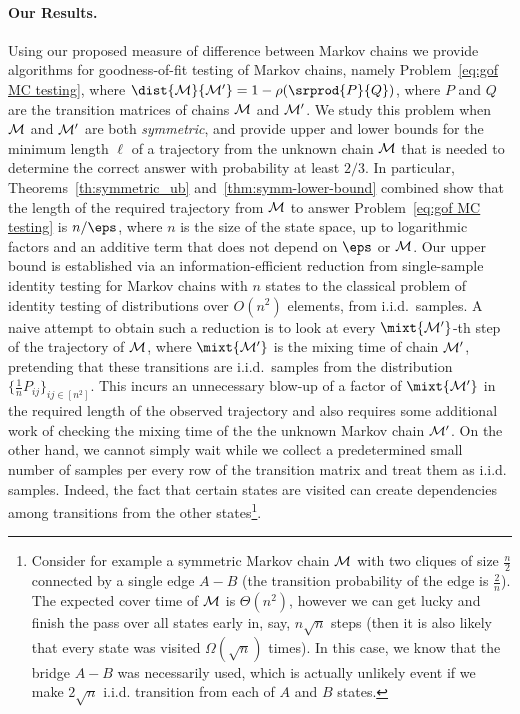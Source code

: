 \paragraph{Our Results.} Using our proposed measure of difference between Markov chains we provide algorithms for  goodness-of-fit testing of Markov chains, namely Problem~\eqref{eq:gof MC testing},
%
%
where $\dist{\cal M}{\cal M'}=1-\rho(\srprod{P}{Q})$, where $P$ and $Q$ are the transition matrices of  chains $\cal M$ and $\cal M'$. We study this problem when $\cal M$ and $\cal M'$ are 
both {\em symmetric}, and provide  upper and lower bounds for the minimum length $\ell$ of a trajectory from the unknown chain $\cal M$ that is needed to determine the correct answer with 
probability at least $2/3$. In particular, Theorems~\ref{th:symmetric_ub} and~\ref{thm:symm-lower-bound} combined show that the length of the required trajectory from $\cal M$ to answer 
Problem~\eqref{eq:gof MC testing} is $n/\eps$, where $n$ is the size of the state space, up to logarithmic factors and an additive term that does not depend on $\eps$ or $\cal M$. Our 
upper bound is established via an information-efficient reduction from single-sample identity testing for Markov chains with $n$ states to the classical problem of identity 
testing of distributions over $O(n^2)$ elements, from i.i.d.~samples. 
A naive attempt to obtain such a reduction is to look at every $\mixt{\cal M'}$-th step of the trajectory of $\cal M$, where 
$\mixt{\cal M'}$ is the mixing time of chain $\cal M'$, pretending that these transitions are i.i.d.~samples 
from the distribution $\{\frac{1}{n} P_{ij}\}_{ij \in [n^2]}$. 
This incurs an unnecessary blow-up of a factor of $\mixt{\cal M'}$ in the required length of the observed trajectory and 
also requires some additional work of checking the mixing time of the the unknown Markov chain $\cal M'$. 
On the other hand, we cannot simply wait while we collect a predetermined small number of samples per every row of the transition matrix and treat them as i.i.d. samples.
Indeed, the fact that certain states are visited can create dependencies among transitions from the other states\footnote{\label{fn:dependency-example} Consider for
example a symmetric Markov chain $\cal M$ with two cliques of size $\frac{n}{2}$ connected by a single edge $A-B$ (the transition probability of the edge is $\frac{2}{n}$).
The expected cover time of $\cal M$ is $\Theta(n^2)$, however we can get lucky and finish the pass over all states early in, say, $n\sqrt{n}$ steps (then it is also
likely that every state was visited $\Omega(\sqrt{n})$ times). In this case, we know that the bridge $A-B$ was necessarily used, which is actually unlikely event if we 
make $2\sqrt{n}$ i.i.d. transition from each of $A$ and $B$ states.}. 
